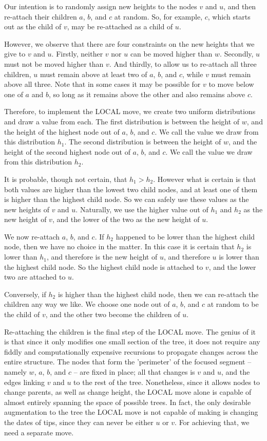 \documentclass[10pt,journal,compsoc]{IEEEtran}
\begin{document}
Our intention is to randomly assign new heights to the nodes $v$ and $u$, and then re-attach their children $a$, $b$, and $c$ at random. So, for example, $c$, which starts out as the child of $v$, may be re-attached as a child of $u$.

However, we observe that there are four constraints on the new heights that we give to $v$ and $u$. Firstly, neither $v$ nor $u$ can be moved higher than $w$. Secondly, $u$ must not be moved higher than $v$. And thirdly, to allow us to re-attach all three children, $u$ must remain above at least two of $a$, $b$, and $c$, while $v$ must remain above all three. Note that in some cases it may be possible for $v$ to move below one of $a$ and $b$, so long as it remains above the other and also remains above $c$.

Therefore, to implement the LOCAL move, we create two uniform distributions and draw a value from each. The first distribution is between the height of $w$, and the height of the highest node out of $a$, $b$, and $c$. We call the value we draw from this distribution $h_1$. The second distribution is between the height of $w$, and the height of the second highest node out of $a$, $b$, and $c$. We call the value we draw from this distribution $h_2$.

It is probable, though not certain, that $h_1 > h_2$. However what is certain is that both values are higher than the lowest two child nodes, and at least one of them is higher than the highest child node. So we can safely use these values as the new heights of $v$ and $u$. Naturally, we use the higher value out of $h_1$ and $h_2$ as the new height of $v$, and the lower of the two as the new height of $u$.

We now re-attach $a$, $b$, and $c$. If $h_2$ happened to be lower than the highest child node, then we have no choice in the matter. In this case it is certain that $h_2$ is lower than $h_1$, and therefore is the new height of $u$, and therefore $u$ is lower than the highest child node. So the highest child node is attached to $v$, and the lower two are attached to $u$.

Conversely, if $h_2$ is higher than the highest child node, then we can re-attach the children any way we like. We choose one node out of $a$, $b$, and $c$ at random to be the child of $v$, and the other two become the children of $u$.

Re-attaching the children is the final step of the LOCAL move. The genius of it is that since it only modifies one small section of the tree, it does not require any fiddly and computationally expensive recursions to propagate changes across the entire structure. The nodes that form the 'perimeter' of the focused segment -- namely $w$, $a$, $b$, and $c$ -- are fixed in place; all that changes is $v$ and $u$, and the edges linking $v$ and $u$ to the rest of the tree. Nonetheless, since it allows nodes to change parents, as well as change height, the LOCAL move alone is capable of almost entirely spanning the space of possible trees. In fact, the only desirable augmentation to the tree the LOCAL move is not capable of making is changing the dates of tips, since they can never be either $u$ or $v$. For achieving that, we need a separate move.
\end{document}
